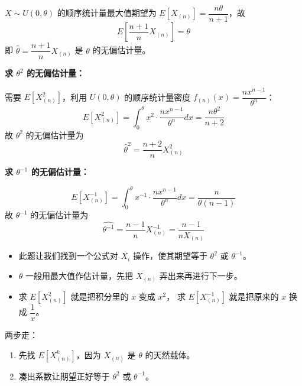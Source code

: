 \begin{solution}
$X \sim U(0,\theta)$ 的顺序统计量最大值期望为 $E[X_{(n)}] = \dfrac{n\theta}{n+1}$，故
\[
E\!\left[\frac{n+1}{n}X_{(n)}\right] = \theta
\]
即 $\hat{\theta} = \dfrac{n+1}{n}X_{(n)}$ 是 $\theta$ 的无偏估计量。

\textbf{求 $\theta^2$ 的无偏估计量：}

需要 $E[X_{(n)}^2]$，利用 $U(0,\theta)$ 的顺序统计量密度 $f_{(n)}(x) = \dfrac{nx^{n-1}}{\theta^n}$：
\[
E[X_{(n)}^2] = \int_0^\theta x^2 \cdot \frac{nx^{n-1}}{\theta^n}dx = \frac{n\theta^2}{n+2}
\]
故 $\theta^2$ 的无偏估计量为
\[
\hat{\theta}^2 = \frac{n+2}{n}X_{(n)}^2
\]

\textbf{求 $\theta^{-1}$ 的无偏估计量：}

\[
E[X_{(n)}^{-1}] = \int_0^\theta x^{-1} \cdot \frac{nx^{n-1}}{\theta^n}dx = \frac{n}{\theta(n-1)}
\]
故 $\theta^{-1}$ 的无偏估计量为
\[
\widehat{\theta^{-1}} = \frac{n-1}{n}X_{(n)}^{-1} = \frac{n-1}{nX_{(n)}}
\]
\end{solution}
\begin{dxtips}
\begin{itemize}
  \item 此题让我们找到一个公式对 $X_i$ 操作，使其期望等于 $\theta^2$ 或 $\theta^{-1}$。
  \item $\theta$ 一般用最大值作估计量，先把 $X_{(n)}$ 弄出来再进行下一步。
  \item 求 $E[X_{(n)}^2]$ 就是把积分里的 $x$ 变成 $x^2$，
        求 $E[X_{(n)}^{-1}]$ 就是把原来的 $x$ 换成 $\dfrac{1}{x}$。
\end{itemize}
\end{dxtips}
两步走：
\begin{enumerate}
  \item 先找 $E[X_{(n)}^k]$，因为 $X_{(n)}$ 是 $\theta$ 的天然载体。
  \item 凑出系数让期望正好等于 $\theta^2$ 或 $\theta^{-1}$。
\end{enumerate}

